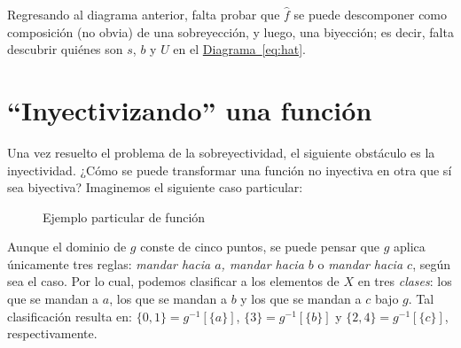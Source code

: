 \documentclass[letterpaper,DIV=14,headsepline,12pt]{scrartcl}
\begin{document}
    Regresando al diagrama anterior, falta probar que $\hat{f}$ se puede descomponer como
    composición (no obvia) de una sobreyección, y luego, una biyección; es decir, falta
    descubrir quiénes son $s$, $b$ y $U$ en el
    \hyperref[eq:hat]{Diagrama~\ref*{eq:hat}}.

    \section*{``Inyectivizando'' una función}

    Una vez resuelto el problema de la sobreyectividad, el siguiente obstáculo
    es la inyectividad. ¿Cómo se puede transformar una función no inyectiva en
    otra que sí sea biyectiva? Imaginemos el siguiente caso particular:
    \begin{figure}[H]\label{fig:ejemplo}
        \begin{center}
        \end{center}
        \caption{Ejemplo particular de función}
    \end{figure}

    Aunque el dominio de $g$ conste de cinco puntos, se puede pensar que $g$
    aplica únicamente tres reglas: \textit{mandar hacia $a$, mandar hacia $b$} o
    \textit{mandar hacia $c$}, según sea el caso. Por lo cual, podemos
    clasificar a los elementos de $X$ en tres \textit{clases}: los que se mandan
    a $a$, los que se mandan a $b$ y los que se mandan a $c$ bajo $g$. Tal
    clasificación resulta en: $\{0,1\}=g^{-1}[\{a\}]$, $\{3\}=g^{-1}[\{b\}]$ y
    $\{2,4\}=g^{-1}[\{c\}]$, respectivamente.
\end{document}
